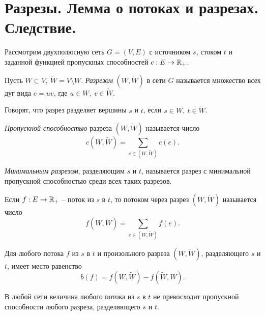 \section{Разрезы. Лемма о потоках и разрезах. Следствие.}

\begin{note}
    Рассмотрим двухполюсную сеть $ G = (V,E) $ с источником $ s $, стоком $ t $ и заданной функцией пропускных способностей $ c: E \rightarrow \mathbb{R}_+ $.
\end{note}

\begin{definition}[Разрез]
    Пусть $ W \subset V, \ \widetilde{W} = V \setminus W $. \emph{Разрезом} $ (W, \widetilde{W}) $ в сети $ G $ называется множество всех дуг вида $ e = uv $, где $ u \in W, \ v \in \widetilde{W} $.
\end{definition}

\begin{note}
    Говорят, что разрез разделяет вершины $ s $ и $ t $, если $ s \in W, \ t \in \widetilde{W} $.
\end{note}

\begin{definition}
    \emph{Пропускной способностью} разреза $ (W, \widetilde{W}) $ называется число
    \[
        c(W,\widetilde{W})= \sum_{e \in (W,\widetilde{W})}c(e).
    \]
\end{definition}

\begin{definition}
    \emph{Минимальным разрезом}, разделяющим $ s $ и $ t $, называется разрез с минимальной пропускной способностью среди всех таких разрезов.
\end{definition}

\begin{definition}
    Если $ f: E \rightarrow \mathbb{R}_+ $ -- поток из $ s $ в $ t $, то потоком через разрез $ (W,\widetilde{W}) $ называется число
    \[
        f(W,\widetilde{W}) = \sum_{e\in(W,\widetilde{W})}f(e).
    \]
\end{definition}

\begin{lemma}
    Для любого потока $ f $ из $ s $ в $ t $ и произольного разреза $ (W,\widetilde{W}) $, разделяющего $ s $ и $ t $, имеет место равенство
    \[
        b(f) = f(W,\widetilde{W}) - f(\widetilde{W},W).
    \]
\end{lemma}

\begin{corollary}
    В любой сети величина любого потока из $ s $ в $ t $ не превосходит пропускной способности любого разреза, разделяющего $ s $ и $ t $.
\end{corollary}

